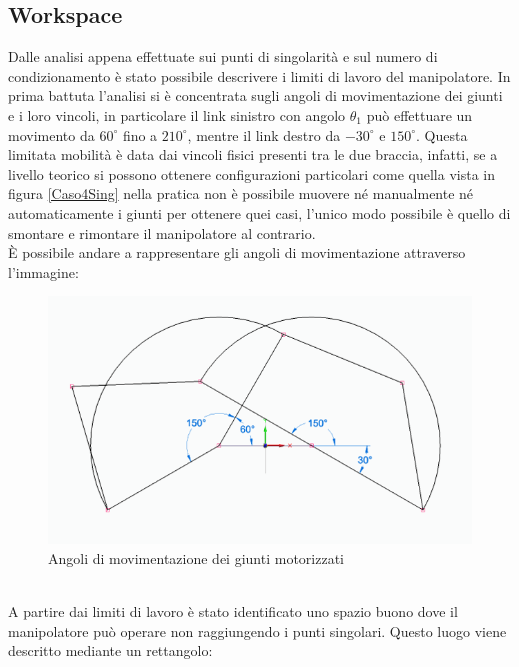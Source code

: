 \subsection{Workspace}
Dalle analisi appena effettuate sui punti di singolarità e sul numero di condizionamento è stato possibile descrivere i limiti di lavoro del manipolatore. In prima battuta l'analisi si è concentrata sugli angoli di movimentazione dei giunti e i loro vincoli, in particolare il link sinistro con angolo $\theta_1$ può effettuare un movimento da $60^\circ$ fino a $210^\circ$, mentre il link destro da $-30^\circ$ e $150^\circ$. Questa limitata mobilità è data dai vincoli fisici presenti tra le due braccia, infatti, se a livello teorico si possono ottenere configurazioni particolari come quella vista in figura \ref{Caso4Sing} nella pratica non è possibile muovere né manualmente né automaticamente i giunti per ottenere quei casi, l'unico modo possibile è quello di smontare e rimontare il manipolatore al contrario. \\È possibile andare a rappresentare gli angoli di movimentazione attraverso l'immagine: 
\begin{figure}[ht]
	\begin{center}
		\includegraphics[scale=0.56]{Immagini/Singolarity/workangle}
		\caption{Angoli di movimentazione dei giunti motorizzati}
	\end{center}
\end{figure}
\\A partire dai limiti di lavoro è stato identificato uno spazio buono dove il manipolatore può operare non raggiungendo i punti singolari. Questo luogo viene descritto mediante un rettangolo:
